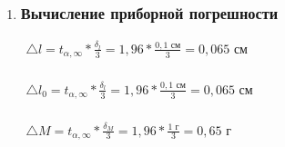 \begin{enumerate}
		\item \subsubsection*{Вычисление приборной погрешности}
		\label{appendix: 6}
		\(\begin{aligned} \triangle l = t_{\alpha, \infty} * \frac{\delta _l}{3} = 1,96 * \frac{0,1 \text{ см}}{3} = 0,065 \text{ см} \end{aligned}\) \\\\
		\(\begin{aligned} \triangle l_0 = t_{\alpha, \infty} * \frac{\delta _l}{3} = 1,96 * \frac{0,1 \text{ см}}{3} = 0,065 \text{ см} \end{aligned}\) \\\\
		\(\begin{aligned} \triangle M = t_{\alpha, \infty} * \frac{\delta _M}{3} = 1,96 * \frac{1 \text{ г}}{3} = 0,65 \text{ г} \end{aligned}\) \\\\
		

\end{enumerate}
